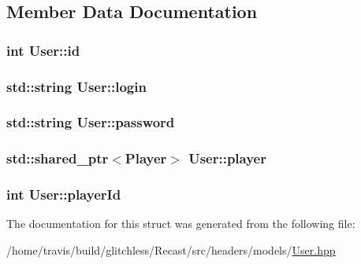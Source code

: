 \subsection{Member Data Documentation}
\hypertarget{struct_user_aa7e6e39b43020bbe9c3a196b3689b0f7}{
\subsubsection[{id}]{\setlength{\rightskip}{0pt plus 5cm}int User\-::id}}\label{struct_user_aa7e6e39b43020bbe9c3a196b3689b0f7}
\hypertarget{struct_user_a68ef4336327a1ee8b4532a6042485f3a}{
\subsubsection[{login}]{\setlength{\rightskip}{0pt plus 5cm}std\-::string User\-::login}}\label{struct_user_a68ef4336327a1ee8b4532a6042485f3a}
\hypertarget{struct_user_ac2f2e75b15e8eb6cbb030fc85a6cd59f}{
\subsubsection[{password}]{\setlength{\rightskip}{0pt plus 5cm}std\-::string User\-::password}}\label{struct_user_ac2f2e75b15e8eb6cbb030fc85a6cd59f}
\hypertarget{struct_user_a55d128918fa7d3e66120d392092227fd}{
\subsubsection[{player}]{\setlength{\rightskip}{0pt plus 5cm}std\-::shared\-\_\-ptr$<${\bf Player}$>$ User\-::player}}\label{struct_user_a55d128918fa7d3e66120d392092227fd}
\hypertarget{struct_user_add1a0a4d41bf6d364738b19f2cee96a6}{
\subsubsection[{player\-Id}]{\setlength{\rightskip}{0pt plus 5cm}int User\-::player\-Id}}\label{struct_user_add1a0a4d41bf6d364738b19f2cee96a6}


The documentation for this struct was generated from the following file\-:\begin{DoxyCompactItemize}
\item 
/home/travis/build/glitchless/\-Recast/src/headers/models/\hyperlink{_user_8hpp}{User.\-hpp}\end{DoxyCompactItemize}
